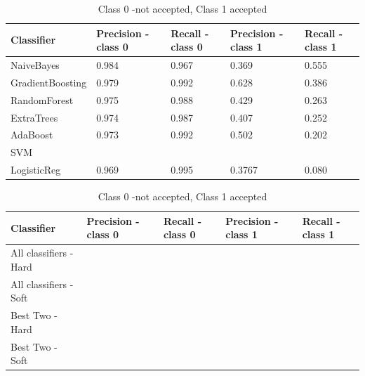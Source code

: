 \begin{table}
 \begin{tabular}{|l |l |l |l |l |}
\hline
Classifier &Precision - class 0 & Recall - class 0  &Precision - class 1 & Recall - class 1  \\ \hline
 NaiveBayes & 0.984 &  0.967&  0.369 & 0.555 \\ 
GradientBoosting & 0.979 & 0.992 &  0.628 & 0.386\\
RandomForest & 0.975 &  0.988 & 0.429&  0.263 \\
ExtraTrees & 0.974 & 0.987 &  0.407& 0.252 \\
AdaBoost & 0.973&  0.992 & 0.502& 0.202 \\
SVM & & & & \\
LogisticReg &0.969 &  0.995& 0.3767 &  0.080\\\hline
\end{tabular}
\caption{Class 0 -not accepted, Class 1 accepted}
\label{table:classifiers}
\end{table}

\begin{table}
 \begin{tabular}{|l |l |l |l |l |}
\hline
Classifier &Precision - class 0 & Recall - class 0  &Precision - class 1 & Recall - class 1  \\ \hline
All classifiers - Hard & & & &\\
All classifiers  - Soft & & & &\\ 
Best Two - Hard & & & &\\
Best Two  - Soft & & & &\\ \hline
\end{tabular}
\caption{Class 0 -not accepted, Class 1 accepted}
\label{table:votingClassifiers}
\end{table}